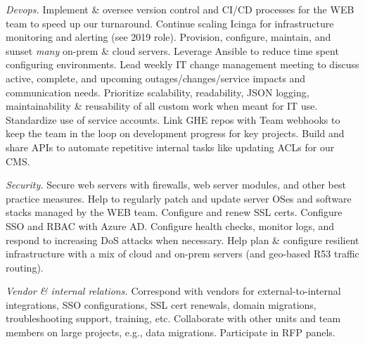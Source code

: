 \documentclass[letterpaper,11pt]{article}
\newcommand{\resumeItem}[1]{%
  \item\small{
    #1
  }
}
\begin{document}
        \resumeItem{
      \textit{Devops.} Implement \& oversee version control and CI/CD processes for the WEB team to speed up our turnaround. Continue scaling Icinga for infrastructure monitoring and alerting (see 2019 role). Provision, configure, maintain, and sunset \textit{many} on-prem \& cloud servers. Leverage Ansible to reduce time spent configuring environments. Lead weekly IT change management meeting to discuss active, complete, and upcoming outages/changes/service impacts and communication needs. Prioritize scalability, readability, JSON logging, maintainability \& reusability of all custom work when meant for IT use. Standardize use of service accounts. Link GHE repos with Team webhooks to keep the team in the loop on development progress for key projects. Build and share APIs to automate repetitive internal tasks like updating ACLs for our CMS.
      }          
      \resumeItem{
      \textit{Security.} Secure web servers with firewalls, web server modules, and other best practice measures. Help to regularly patch and update server OSes and software stacks managed by the WEB team. Configure and renew SSL certs. Configure SSO and RBAC with Azure AD. Configure health checks, monitor logs, and respond to increasing DoS attacks when necessary. Help plan \& configure resilient infrastructure with a mix of cloud and on-prem servers (and geo-based R53 traffic routing).
      } 
      \resumeItem{
      \textit{Vendor \& internal relations.} Correspond with vendors for external-to-internal integrations, SSO configurations, SSL cert renewals, domain migrations, troubleshooting support, training, etc. Collaborate with other units and team members on large projects, e.g., data migrations. Participate in RFP panels. 
      }
\end{document}
